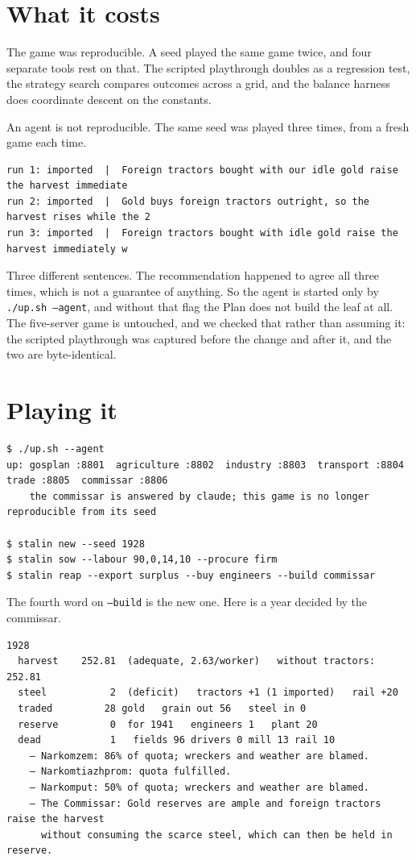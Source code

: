 \documentclass[11pt,a4paper]{article}
\begin{document}
\section{What it costs}

The game was reproducible. A seed played the same game twice, and four separate tools rest on
that. The scripted playthrough doubles as a regression test, the strategy search compares
outcomes across a grid, and the balance harness does coordinate descent on the constants.

An agent is not reproducible. The same seed was played three times, from a fresh game each
time.

\begin{lstlisting}[language=SH]
run 1: imported  |  Foreign tractors bought with our idle gold raise the harvest immediate
run 2: imported  |  Gold buys foreign tractors outright, so the harvest rises while the 2
run 3: imported  |  Foreign tractors bought with idle gold raise the harvest immediately w
\end{lstlisting}

Three different sentences. The recommendation happened to agree all three times, which is not a
guarantee of anything. So the agent is started only by \texttt{./up.sh --agent}, and without
that flag the Plan does not build the leaf at all. The five-server game is untouched, and we
checked that rather than assuming it: the scripted playthrough was captured before the change
and after it, and the two are byte-identical.

\section{Playing it}

\begin{lstlisting}[language=SH]
$ ./up.sh --agent
up: gosplan :8801  agriculture :8802  industry :8803  transport :8804  trade :8805  commissar :8806
    the commissar is answered by claude; this game is no longer reproducible from its seed

$ stalin new --seed 1928
$ stalin sow --labour 90,0,14,10 --procure firm
$ stalin reap --export surplus --buy engineers --build commissar
\end{lstlisting}

The fourth word on \texttt{--build} is the new one. Here is a year decided by the commissar.

\begin{lstlisting}[language=SH]
  1928
  harvest    252.81  (adequate, 2.63/worker)   without tractors: 252.81
  steel           2  (deficit)   tractors +1 (1 imported)   rail +20
  traded         28 gold   grain out 56   steel in 0
  reserve         0  for 1941   engineers 1   plant 20
  dead            1   fields 96 drivers 0 mill 13 rail 10
    — Narkomzem: 86% of quota; wreckers and weather are blamed.
    — Narkomtiazhprom: quota fulfilled.
    — Narkomput: 50% of quota; wreckers and weather are blamed.
    — The Commissar: Gold reserves are ample and foreign tractors raise the harvest
      without consuming the scarce steel, which can then be held in reserve.
\end{lstlisting}
\end{document}
